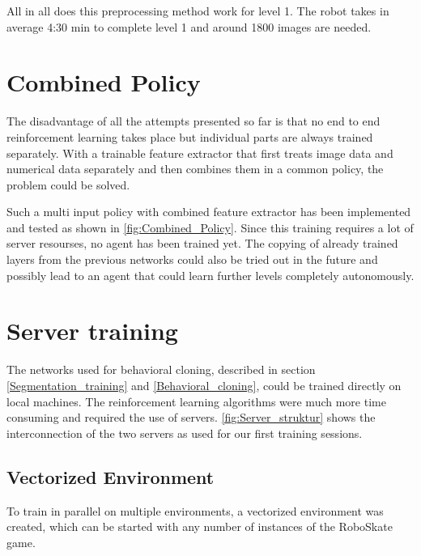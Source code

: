 \documentclass[conference]{IEEEtran}
\begin{document}
All in all does this preprocessing method work for level 1. The robot takes in average 4:30 min to complete level 1 and around 1800 images are needed. 


\section{Combined Policy}
The disadvantage of all the attempts presented so far is that no end to end reinforcement learning takes place but individual parts are always trained separately. With a trainable feature extractor that first treats image data and numerical data separately and then combines them in a common policy, the problem could be solved.

Such a multi input policy with combined feature extractor has been implemented and tested as shown in \figurename  \ref{fig:Combined_Policy}. Since this training requires a lot of server resourses, no agent has been trained yet. The copying of already trained layers from the previous networks could also be tried out in the future and possibly lead to an agent that could learn further levels completely autonomously.

\section{Server training}
The networks used for behavioral cloning, described in section \ref{Segmentation_training} and \ref{Behavioral_cloning}, could be trained directly on local machines. The reinforcement learning algorithms were much more time consuming and required the use of servers.
\figurename  \ref{fig:Server_struktur} shows the interconnection of the two servers as used for our first training sessions.

\subsection{Vectorized Environment}
To train in parallel on multiple environments, a vectorized environment was created, which can be started with any number of instances of the RoboSkate game.
\end{document}
